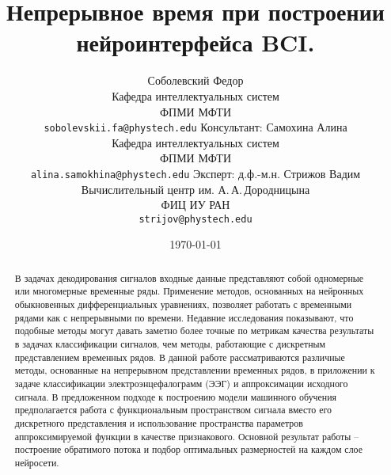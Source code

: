\documentclass[a4paper, 12pt]{article} %
\title{Непрерывное время при построении нейроинтерфейса BCI.}
\author{ Соболевский Федор\\
	Кафедра интеллектуальных систем \\
        ФПМИ МФТИ\\ 
	\texttt{sobolevskii.fa@phystech.edu} 
	\AND
        Консультант: Самохина Алина\\
	Кафедра интеллектуальных систем \\
        ФПМИ МФТИ\\
	\texttt{alina.samokhina@phystech.edu} 
        \AND
        Эксперт: д.ф.-м.н. Стрижов Вадим\\
	Вычислительный центр им. А.\,А.\,Дородницына\\
        ФИЦ ИУ РАН \\
	\texttt{strijov@phystech.edu}
}
\date{\today}
\begin{document}
\maketitle

\begin{abstract}
В задачах декодирования сигналов входные данные представляют собой одномерные или многомерные временные ряды. Применение методов, основанных на нейронных обыкновенных дифференциальных уравнениях, позволяет работать с временными рядами как с непрерывными по времени. Недавние исследования показывают, что подобные методы могут давать заметно более точные по метрикам качества результаты в задачах классификации сигналов, чем методы, работающие с дискретным представлением временных рядов. В данной работе рассматриваются различные методы, основанные на непрерывном представлении временных рядов, в приложении к задаче классификации электроэнцефалограмм (ЭЭГ) и аппроксимации исходного сигнала. В предложенном подходе к построению модели машинного обучения предполагается работа с функциональным пространством сигнала вместо его дискретного представления и использование пространства параметров аппроксимируемой функции в качестве признакового. Основной результат работы – построение обратимого потока и подбор оптимальных размерностей на каждом слое нейросети. 
\end{abstract}



 


\end{document}
